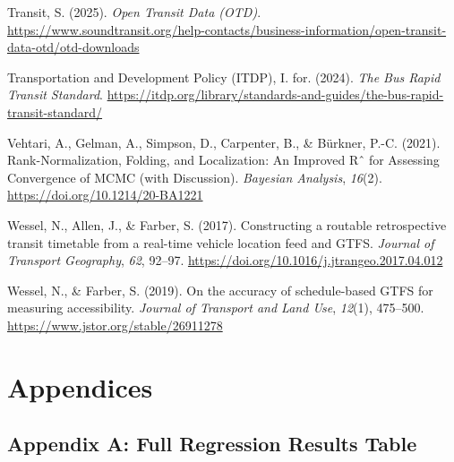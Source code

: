 \documentclass[
  12pt,
]{article}
\newlength{\cslhangindent}
\newenvironment{CSLReferences}[2] %
 {\begin{list}{}{%
  \setlength{\itemindent}{0pt}
  \setlength{\leftmargin}{0pt}
  \setlength{\parsep}{0pt}
  \ifodd #1
   \setlength{\leftmargin}{\cslhangindent}
   \setlength{\itemindent}{-1\cslhangindent}
  \fi
  \setlength{\itemsep}{#2\baselineskip}}}
 {\end{list}}
\begin{document}
\begin{CSLReferences}{1}{0}
Transit, S. (2025). \emph{Open {Transit} {Data} ({OTD})}.
\url{https://www.soundtransit.org/help-contacts/business-information/open-transit-data-otd/otd-downloads}

Transportation and Development Policy (ITDP), I. for. (2024). \emph{The
{Bus} {Rapid} {Transit} {Standard}}.
\url{https://itdp.org/library/standards-and-guides/the-bus-rapid-transit-standard/}

Vehtari, A., Gelman, A., Simpson, D., Carpenter, B., \& Bürkner, P.-C.
(2021). Rank-{Normalization}, {Folding}, and {Localization}: {An}
{Improved} {Rˆ} for {Assessing} {Convergence} of {MCMC} (with
{Discussion}). \emph{Bayesian Analysis}, \emph{16}(2).
\url{https://doi.org/10.1214/20-BA1221}

Wessel, N., Allen, J., \& Farber, S. (2017). Constructing a routable
retrospective transit timetable from a real-time vehicle location feed
and {GTFS}. \emph{Journal of Transport Geography}, \emph{62}, 92--97.
\url{https://doi.org/10.1016/j.jtrangeo.2017.04.012}

Wessel, N., \& Farber, S. (2019). On the accuracy of schedule-based
{GTFS} for measuring accessibility. \emph{Journal of Transport and Land
Use}, \emph{12}(1), 475--500.
\url{https://www.jstor.org/stable/26911278}

\end{CSLReferences}

\newpage

\section{Appendices}\label{appendices}

\subsection{Appendix A: Full Regression Results
Table}\label{appendix-a-full-regression-results-table}

\begingroup\fontsize{9}{11}\selectfont
\end{document}

